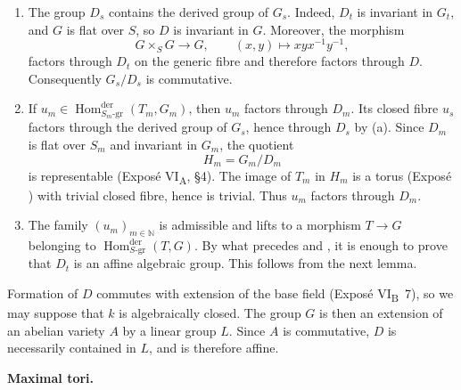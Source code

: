 \begin{enumerate}
\renewcommand{\labelenumi}{\textup{\alph{enumi})}}
\item The group \(D_s\) contains the derived group of \(G_s\).
Indeed, \(D_t\) is invariant in \(G_t\), and \(G\) is flat over
\(S\), so \(D\) is invariant in \(G\). Moreover, the morphism
\[
  G\times_S G\longrightarrow G,
  \qquad (x,y)\longmapsto xyx^{-1}y^{-1},
\]
factors through \(D_t\) on the generic fibre and therefore factors
through \(D\). Consequently \(G_s/D_s\) is commutative.

\item If
\(u_m\in
\operatorname{Hom}^{\mathrm{der}}_{S_m\text{-gr}}(T_m,G_m)\),
then \(u_m\) factors through \(D_m\). Its closed fibre \(u_s\)
factors through the derived group of \(G_s\), hence through \(D_s\)
by \textup{(a)}. Since \(D_m\) is flat over \(S_m\) and invariant
in \(G_m\), the quotient
\[
  H_m=G_m/D_m
\]
is representable (Exposé VI\textsubscript{A}, \S4). The image of
\(T_m\) in \(H_m\) is a torus (Exposé ) with trivial closed
fibre, hence is trivial. Thus \(u_m\) factors through \(D_m\).

\item The family \((u_m)_{m\in\mathbb N}\) is admissible and lifts
to a morphism \(T\to G\) belonging to
\(\operatorname{Hom}^{\mathrm{der}}_{S\text{-gr}}(T,G)\).
By what precedes and , it is enough to prove that
\(D_t\) is an affine algebraic group. This follows from the next lemma.
\end{enumerate}


Formation of \(D\) commutes with extension of the base field
(Exposé VI\textsubscript{B}~7), so we may suppose that \(k\) is
algebraically closed. The group \(G\) is then an extension of an
abelian variety \(A\) by a linear group \(L\). Since \(A\) is
commutative, \(D\) is necessarily contained in \(L\), and is
therefore affine.

\medskip\noindent\textbf{Maximal tori.}

